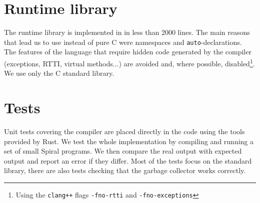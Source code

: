 \section{Runtime library}

The runtime library is implemented in \Cplusplus{} in less than 2000 lines. The
main reasons that lead us to use \Cplusplus{} instead of pure C were namespaces and
\texttt{auto}-declarations. The features of the language that require hidden
code generated by the compiler (exceptions, RTTI, virtual methods...) are
avoided and, where possible, disabled\footnote{Using the \texttt{clang++} flags
\texttt{-fno-rtti} and \texttt{-fno-exceptions}}. We use only the C standard
library.

\section{Tests}

Unit tests covering the compiler are placed directly in the code using the tools
provided by Rust. We test the whole implementation by compiling and running a
set of small Spiral programs. We then compare the real output with expected
output and report an error if they differ. Most of the tests focus on the
standard library, there are also tests checking that the garbage collector works
correctly.
